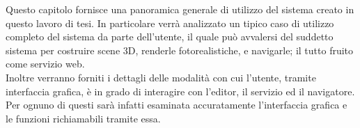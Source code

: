 Questo capitolo fornisce una panoramica generale di utilizzo del sistema creato in questo lavoro di tesi. In particolare verrà analizzato un tipico caso di utilizzo completo del sistema da parte dell'utente, il quale può avvalersi del suddetto sistema per costruire scene 3D, renderle fotorealistiche, e navigarle; il tutto fruito come servizio web.
\\
Inoltre verranno forniti i dettagli delle modalità con cui l'utente, tramite interfaccia grafica, è in grado di interagire con l'editor, il servizio ed il navigatore. 
\\
Per ognuno di questi sarà infatti esaminata accuratamente l'interfaccia grafica e le funzioni richiamabili tramite essa.